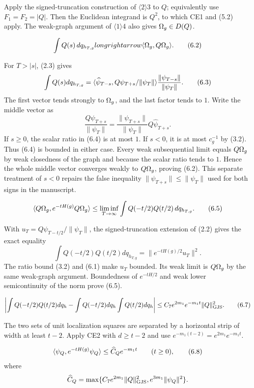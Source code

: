 \documentclass[11pt,a4paper]{article}
\begin{document}
\Because Apply the signed-truncation construction of $\langle2\rangle3$ to $Q$;
equivalently use $F_1=F_2=|Q|$.  Then the Euclidean integrand is $Q^2$, to
which CE1 and (5.2) apply.  The weak-graph argument of $\langle1\rangle4$ also gives
$\Omega_g\in D(Q)$.

\[
 \int Q(s)\,dq_{h_{T,g}}longrightarrow\langle \Omega_g,Q\Omega_g\rangle.        \tag{6.2}
\]

\Because For $T>|s|$, (2.3) gives
\[
 \int Q(s)dq_{h_{T,g}}
 =\langle \widehat\psi_{T-s},Q\psi_{T+s}/\|\psi_T\|\rangle
   \frac{\|\psi_{T-s}\|}{\|\psi_T\|}.                            \tag{6.3}
\]
The first vector tends strongly to $\Omega_g$, and the last factor tends to $1$.
Write the middle vector as
\[
 \frac{Q\psi_{T+s}}{\|\psi_T\|}
 =\frac{\|\psi_{T+s}\|}{\|\psi_T\|}Q\widehat\psi_{T+s}.          \tag{6.4}
\]
If $s\geq0$, the scalar ratio in (6.4) is at most $1$.  If $s<0$, it is at
most $c_g^{-1}$ by (3.2).  Thus (6.4) is bounded in either case.  Every weak
subsequential limit equals $Q\Omega_g$ by weak closedness of the graph and because the
scalar ratio tends to $1$.  Hence the whole middle vector converges weakly to
$Q\Omega_g$, proving (6.2).  This separate treatment of $s<0$ repairs the false
inequality $\|\psi_{T+s}\|\leq\|\psi_T\|$ used for both signs in the manuscript.

\[
 \langle Q\Omega_g,e^{-tH(g)}Q\Omega_g\rangle
 \leq\liminf_{T\to\infty}
 \int Q(-t/2)Q(t/2)\,dq_{h_{T,g}}.                                 \tag{6.5}
\]

\Because With
$u_T=Q\psi_{T-t/2}/\|\psi_T\|$, the signed-truncation extension of (2.2) gives
the exact equality
\[
 \int Q(-t/2)Q(t/2)dq_{h_{T,g}}=\|e^{-tH(g)/2}u_T\|^2.             \tag{6.6}
\]
The ratio bound (3.2) and (6.1) make $u_T$ bounded.  Its weak limit is
$Q\Omega_g$ by the same weak-graph argument.  Boundedness of $e^{-tH/2}$ and weak
lower semicontinuity of the norm prove (6.5).

\[
 \left|\int Q(-t/2)Q(t/2)dq_h
 -\int Q(-t/2)dq_h\int Q(t/2)dq_h\right|
 \leq C_7e^{2m_1}e^{-m_1t}\|Q\|_{\rm GJS}^2.                      \tag{6.7}
\]

\Because The two sets of unit localization squares are separated by a horizontal
strip of width at least $t-2$.  Apply CE2 with $d\geq t-2$ and use
$e^{-m_1(t-2)}=e^{2m_1}e^{-m_1t}$.

\[
 \langle \psi_Q,e^{-tH(g)}\psi_Q\rangle
 \leq\widehat C_Qe^{-m_1t}\qquad(t\geq0),                          \tag{6.8}
\]
where
\[
 \widehat C_Q=\max\{C_7e^{2m_1}\|Q\|_{\rm GJS}^2,
                     e^{3m_1}\|\psi_Q\|^2\}.
\]
\end{document}
